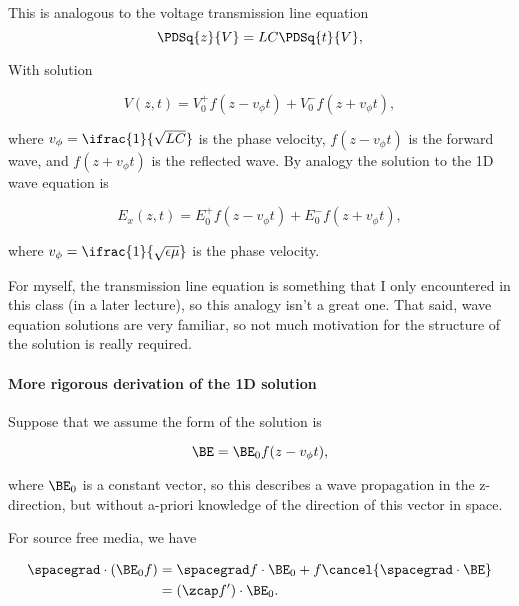This is analogous to the voltage transmission line equation
\begin{equation}\label{eqn:uwavesLecture2:440}
\PDSq{z}{V} = L C \PDSq{t}{V},
\end{equation}

With solution

\begin{equation}\label{eqn:uwavesLecture2:280}
V(z, t) =
V_0^{+} f(z - v_\phi t)
+
V_0^{-} f(z + v_\phi t),
\end{equation}

where \( v_\phi = \ifrac{1}{\sqrt{L C}} \) is the phase velocity, \( f(z - v_\phi t)\) is the forward wave, and \( f(z + v_\phi t) \) is the reflected wave.  By analogy the solution to the 1D wave equation is

\begin{equation}\label{eqn:uwavesLecture2:300}
E_x(z, t) =
E_0^{+} f(z - v_\phi t)
+
E_0^{-} f(z + v_\phi t),
\end{equation}

where \( v_\phi = \ifrac{1}{\sqrt{\epsilon \mu}} \) is the phase velocity.

For myself, the transmission line equation is something that I only encountered in this class (in a later lecture), so this analogy isn't a great one.  That said, wave equation solutions are very familiar, so not much motivation for the structure of the solution is really required.

\paragraph{More rigorous derivation of the 1D solution}

Suppose that we assume the form of the solution is

\begin{equation}\label{eqn:uwavesLecture2:320}
\BE = \BE_0 f(z - v_\phi t ),
\end{equation}

where \( \BE_0 \) is a constant vector, so this describes a wave propagation in the z-direction, but without a-priori knowledge of the direction of this vector in space.

For source free media, we have

\begin{equation}\label{eqn:uwavesLecture2:340}
\begin{aligned}
\spacegrad \cdot ( \BE_0 f )
&= \spacegrad f \cdot \BE_0 + f \cancel{ \spacegrad \cdot \BE }
\\ &= (\zcap f') \cdot \BE_0.
\end{aligned}
\end{equation}

